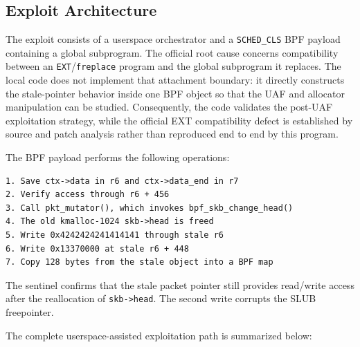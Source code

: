 \documentclass[../main.tex]{subfiles}
\begin{document}
\subsection{Exploit Architecture}

The exploit consists of a userspace orchestrator and a \texttt{SCHED\_CLS} BPF payload containing a global subprogram. The official root cause concerns compatibility between an \texttt{EXT}/\texttt{freplace} program and the global subprogram it replaces. The local code does not implement that attachment boundary: it directly constructs the stale-pointer behavior inside one BPF object so that the UAF and allocator manipulation can be studied. Consequently, the code validates the post-UAF exploitation strategy, while the official EXT compatibility defect is established by source and patch analysis rather than reproduced end to end by this program.

The BPF payload performs the following operations:

\begin{lstlisting}[caption={Simplified BPF payload used by the new exploit.}]
1. Save ctx->data in r6 and ctx->data_end in r7
2. Verify access through r6 + 456
3. Call pkt_mutator(), which invokes bpf_skb_change_head()
4. The old kmalloc-1024 skb->head is freed
5. Write 0x4242424241414141 through stale r6
6. Write 0x13370000 at stale r6 + 448
7. Copy 128 bytes from the stale object into a BPF map
\end{lstlisting}

The sentinel confirms that the stale packet pointer still provides read/write access after the reallocation of \texttt{skb->head}. The second write corrupts the SLUB freepointer.

The complete userspace-assisted exploitation path is summarized below:
\end{document}
